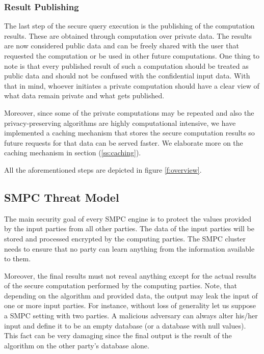 \subsubsection{Result Publishing}\label{sss:result-publishing}
The last step of the secure query execution is the publishing of the computation results.
These are obtained through computation over private data.
The results are now considered public data and can be freely shared with the user that requested the computation or be used in other future computations.
One thing to note is that every published result of such a computation should be treated as public data and should not be confused with the confidential input data.
With that in mind, whoever initiates a private computation should have a clear view of what data remain private and what gets published.

Moreover, since some of the private computations may be repeated and also the privacy\hyp preserving algorithms are highly computational intensive, we have implemented a caching mechanism that stores the secure computation results so future requests for that data can be served faster.
We elaborate more on the caching mechanism in section (\ref{ss:caching}).


All the aforementioned steps are depicted in figure \ref{f:overview}.




\subsection{SMPC Threat Model}\label{s:smpc-threat-model}
The main security goal of every SMPC engine is to protect the values provided by the input parties from all other parties.
The data of the input parties will be stored and processed encrypted by the computing parties.
The SMPC cluster needs to ensure that no party can learn anything from the information available to them.

Moreover, the final results must not reveal anything except for the actual results of the secure computation performed by the computing parties.
Note, that depending on the algorithm and provided data, the output may leak the input of one or more input parties.
For instance, without loss of generality let us suppose a SMPC setting with two parties.
A malicious adversary can always alter his/her input and define it to be an empty database (or a database with null values).
This fact can be very damaging since the final output is the result of the algorithm on the other party’s database alone.

